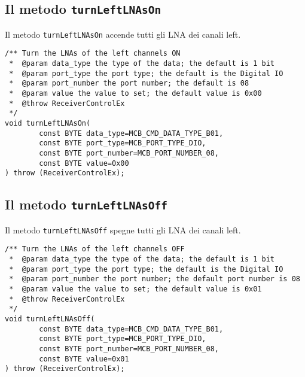 \subsection{Il metodo \texttt{turnLeftLNAsOn}}
Il metodo \texttt{turnLeftLNAsOn} accende tutti gli LNA dei canali left.
\lstset{language=C++}
\begin{lstlisting}[caption={Dichiarazione del metodo \texttt{turnLeftLNAsOn}},
label=lst:turnLeftLNAsOn,mathescape]
/** Turn the LNAs of the left channels ON
 *  @param data_type the type of the data; the default is 1 bit
 *  @param port_type the port type; the default is the Digital IO
 *  @param port_number the port number; the default is 08
 *  @param value the value to set; the default value is 0x00
 *  @throw ReceiverControlEx
 */
void turnLeftLNAsOn(
        const BYTE data_type=MCB_CMD_DATA_TYPE_B01,
        const BYTE port_type=MCB_PORT_TYPE_DIO,
        const BYTE port_number=MCB_PORT_NUMBER_08,
        const BYTE value=0x00
) throw (ReceiverControlEx);
\end{lstlisting}
\lstset{numbers=none}


\subsection{Il metodo \texttt{turnLeftLNAsOff}}
Il metodo \texttt{turnLeftLNAsOff} spegne tutti gli LNA dei canali left.
\lstset{language=C++}
\begin{lstlisting}[caption={Dichiarazione del metodo \texttt{turnLeftLNAsOff}},
label=lst:turnLeftLNAsOff,mathescape]
/** Turn the LNAs of the left channels OFF
 *  @param data_type the type of the data; the default is 1 bit
 *  @param port_type the port type; the default is the Digital IO
 *  @param port_number the port number; the default port number is 08
 *  @param value the value to set; the default value is 0x01
 *  @throw ReceiverControlEx
 */
void turnLeftLNAsOff(
        const BYTE data_type=MCB_CMD_DATA_TYPE_B01,
        const BYTE port_type=MCB_PORT_TYPE_DIO,
        const BYTE port_number=MCB_PORT_NUMBER_08,
        const BYTE value=0x01
) throw (ReceiverControlEx);
\end{lstlisting}
\lstset{numbers=none}


